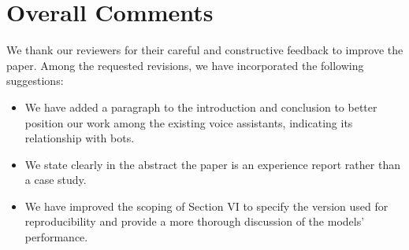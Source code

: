 \documentclass[journal,12pt,onecolumn,draftclsnofoot,]{IEEEtran}
\begin{document}
%
%
%
%
%

\section{Overall Comments}

We thank our reviewers for their careful and constructive feedback to improve the paper. Among the requested revisions, we have incorporated the following suggestions:

\begin{itemize}
\item We have added a paragraph to the introduction and conclusion to better position our work among the existing voice assistants, indicating its relationship with bots.
\item We state clearly in the abstract the paper is an experience report rather than a case study.
\item We have improved the scoping of Section VI to specify the version used for reproducibility and provide a more thorough discussion of the models' performance.
\end{itemize}
\end{document}
